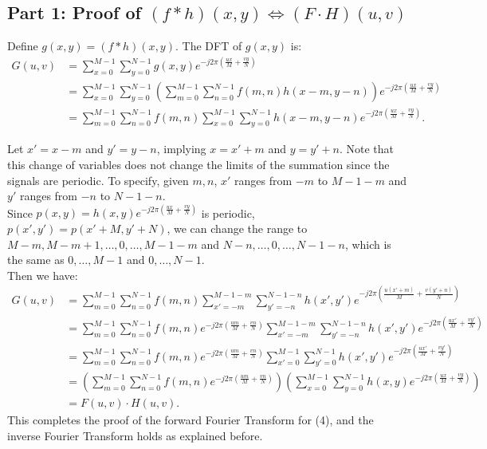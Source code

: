 \documentclass[UTF8]{ctexart}
\begin{document}
\subsection*{Part 1: Proof of \( (f * h)(x, y) \Leftrightarrow  (F \cdot H)(u, v) \)}

Define \( g(x, y) = (f * h)(x, y) \). The DFT of \( g(x, y) \) is:
\[
\begin{aligned}
G(u, v) &= \sum_{x=0}^{M-1} \sum_{y=0}^{N-1} g(x, y) e^{-j2\pi \left( \frac{ux}{M} + \frac{vy}{N} \right)} \\
&= \sum_{x=0}^{M-1} \sum_{y=0}^{N-1} \left( \sum_{m=0}^{M-1} \sum_{n=0}^{N-1} f(m, n) h(x-m, y-n) \right) e^{-j2\pi \left( \frac{ux}{M} + \frac{vy}{N} \right)} \\
&= \sum_{m=0}^{M-1} \sum_{n=0}^{N-1} f(m, n) \sum_{x=0}^{M-1} \sum_{y=0}^{N-1} h(x-m, y-n) e^{-j2\pi \left( \frac{ux}{M} + \frac{vy}{N} \right)}.
\end{aligned}
\]

Let \( x' = x - m \) and \( y' = y - n \), implying \( x = x' + m \) and \( y = y' + n \). Note that this change of variables does not change the limits of the summation since the signals are periodic. To specify, 
given $m, n$, $x'$ ranges from $-m$ to $M-1-m$ and $y'$ ranges from $-n$ to $N-1-n$.\\ Since $p(x,y) = h(x,y)e^{-j2\pi \left( \frac{ux}{M} + \frac{vy}{N} \right)}$ is periodic, $p(x',y') = p(x'+M,y'+N)$,
we can change the range to $M-m, M-m+1, \ldots, 0, \ldots, M-1-m$ and $N-n, \ldots, 0, \ldots, N-1-n$, which is the same as $0, \ldots, M-1$ and $0, \ldots, N-1$.\\
Then we have:
\[
\begin{aligned}
    G(u, v) &= \sum_{m=0}^{M-1} \sum_{n=0}^{N-1} f(m, n) \sum_{x'=-m}^{M-1-m} \sum_{y'=-n}^{N-1-n} h(x', y') e^{-j2\pi \left( \frac{u(x'+m)}{M} + \frac{v(y'+n)}{N} \right)} \\
    &= \sum_{m=0}^{M-1} \sum_{n=0}^{N-1} f(m, n) e^{-j2\pi \left( \frac{um}{M} + \frac{vn}{N} \right)} \sum_{x'=-m}^{M-1-m} \sum_{y'=-n}^{N-1-n} h(x', y') e^{-j2\pi \left( \frac{ux'}{M} + \frac{vy'}{N} \right)} \\
    &= \sum_{m=0}^{M-1} \sum_{n=0}^{N-1} f(m, n) e^{-j2\pi \left( \frac{um}{M} + \frac{vn}{N} \right)} \sum_{x'=0}^{M-1} \sum_{y'=0}^{N-1} h(x', y') e^{-j2\pi \left( \frac{ux'}{M} + \frac{vy'}{N} \right)} \\
    &= \left( \sum_{m=0}^{M-1} \sum_{n=0}^{N-1} f(m, n) e^{-j2\pi \left( \frac{um}{M} + \frac{vn}{N} \right)} \right) \left( \sum_{x=0}^{M-1} \sum_{y=0}^{N-1} h(x, y) e^{-j2\pi \left( \frac{ux}{M} + \frac{vy}{N} \right)} \right) \\
    &= F(u, v) \cdot H(u, v).
\end{aligned}
\]
This completes the proof of the forward Fourier Transform for (4), and the inverse Fourier Transform holds as explained before.
\end{document}

